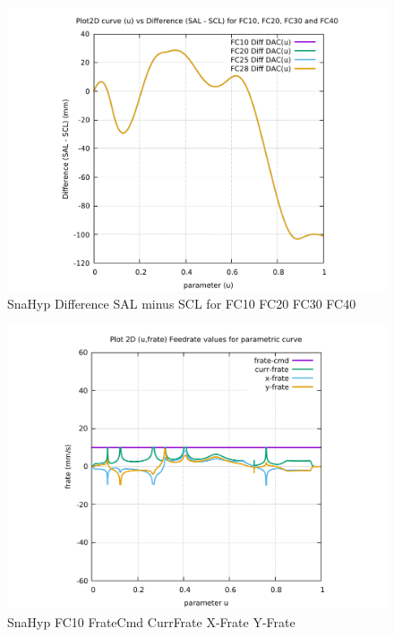 \begin{figure}
	\caption     {SnaHyp Difference SAL minus SCL for FC10 FC20 FC30 FC40}
	\label{26-img-SnaHyp-Difference-SAL-minus-SCL-for-FC10-FC20-FC30-FC40.pdf}
\includegraphics[width=1.00\textwidth]{Chap4/appendix/app-SnaHyp/plots/26-img-SnaHyp-Difference-SAL-minus-SCL-for-FC10-FC20-FC30-FC40.pdf}
\end{figure}


\clearpage
\pagebreak

\begin{figure}
	\caption     {SnaHyp FC10 FrateCmd CurrFrate X-Frate Y-Frate}
	\label{27-img-SnaHyp-FC10-FrateCmd-CurrFrate-X-Frate-Y-Frate.pdf}
\includegraphics[width=1.00\textwidth]{Chap4/appendix/app-SnaHyp/plots/27-img-SnaHyp-FC10-FrateCmd-CurrFrate-X-Frate-Y-Frate.pdf}
\end{figure}


